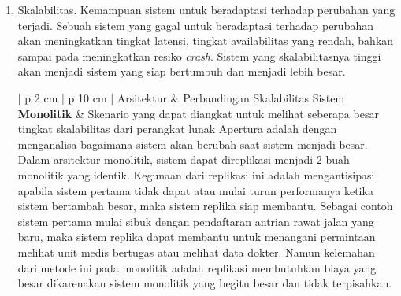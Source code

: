 \begin{enumerate}[leftmargin=*]
\begin{table}[H]
\begin{adjustbox}{width=1\textwidth}
\begin{tabular}{| p {2 cm} | p {10 cm} |}
				Dalam arsitektur monolitik, \textit{status down} yang terjadi mengharuskan sistem untuk tidak berfungsi sementara, yang dimana berarti semua fitur tidak akan berfungsi seluruhnya dikarenakan modul-modul bergantung pada 1 buah database dalam sebuah \textit{server} terpusat.
				\\
				\hline
				\textbf{Microservice} & Pada model arsitektur microservice, \textit{status down} yang terjadi tidak akan menyebabkan keseluruhan fitur menjadi lumpuh. Misalnya apabila mengharuskan terjadi \textit{down} pada modul rawat jalan, maka fitur menampilkan, menambah, menghapus, dan mencari data rawat jalan akan tidak dapat berfungsi, namun 9 fitur yang lain seperti melihat unit medis bertugas, melihat data dokter dan data pasien akan tetap berjalan dengan normal. Menjadikan sistem lebih \textit{high availability}.\\
				\hline
			\end{tabular}
		\end{adjustbox}
	\end{table}
	\item Skalabilitas. Kemampuan sistem untuk beradaptasi terhadap perubahan yang terjadi. Sebuah sistem yang gagal untuk beradaptasi terhadap perubahan akan meningkatkan tingkat latensi, tingkat availabilitas yang rendah, bahkan sampai pada meningkatkan resiko \textit{crash}. Sistem yang skalabilitasnya tinggi akan menjadi sistem yang siap bertumbuh dan menjadi lebih besar.
		\begin{table}[H]
		\small
		\begin{adjustbox}{width=1\textwidth}
			\begin{tabular}{| p {2 cm} | p {10 cm} |}
				\hline
				Arsitektur & Perbandingan Skalabilitas Sistem\\
				\hline
				\textbf{Monolitik} & Skenario yang dapat diangkat untuk melihat seberapa besar tingkat skalabilitas dari perangkat lunak Apertura adalah dengan menganalisa bagaimana sistem akan berubah saat sistem menjadi besar. Dalam arsitektur monolitik, sistem dapat direplikasi menjadi 2 buah monolitik yang identik. Kegunaan dari replikasi ini adalah mengantisipasi apabila sistem pertama tidak dapat atau mulai turun performanya ketika sistem bertambah besar, maka sistem replika siap membantu. Sebagai contoh sistem pertama mulai sibuk dengan pendaftaran antrian rawat jalan yang baru, maka sistem replika dapat membantu untuk menangani permintaan melihat unit medis bertugas atau melihat data dokter. Namun kelemahan dari metode ini pada monolitik adalah replikasi membutuhkan biaya yang besar dikarenakan sistem monolitik yang begitu besar dan tidak terpisahkan.\\

\end{tabular}
\end{adjustbox}
\end{table}
\end{enumerate}
